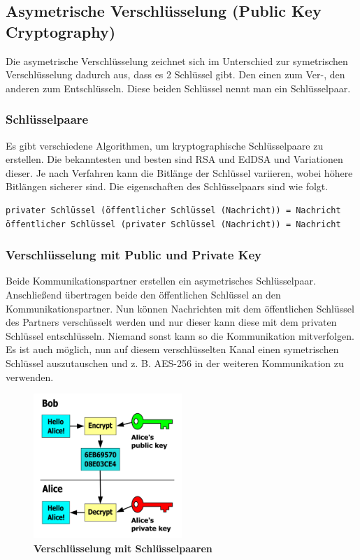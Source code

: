 \clearpage

\subsection{Asymetrische Verschlüsselung (Public Key Cryptography)}

Die asymetrische Verschlüsselung zeichnet sich im Unterschied zur symetrischen
Verschlüsselung dadurch aus, dass es 2 Schlüssel gibt. Den einen zum Ver-, den anderen
zum Entschlüsseln. Diese beiden Schlüssel nennt man ein Schlüsselpaar.

\subsubsection{Schlüsselpaare}
Es gibt verschiedene Algorithmen, um kryptographische Schlüsselpaare zu erstellen.
Die bekanntesten und besten sind RSA und EdDSA und Variationen dieser.
Je nach Verfahren kann die Bitlänge der Schlüssel variieren, wobei höhere Bitlängen
sicherer sind. Die eigenschaften des Schlüsselpaars sind wie folgt.

\begin{lstlisting}
privater Schlüssel (öffentlicher Schlüssel (Nachricht)) = Nachricht
öffentlicher Schlüssel (privater Schlüssel (Nachricht)) = Nachricht 
\end{lstlisting}

\subsubsection{Verschlüsselung mit Public und Private Key}

Beide Kommunikationspartner erstellen ein asymetrisches Schlüsselpaar.
Anschließend übertragen beide den öffentlichen Schlüssel an den Kommunikationspartner.
Nun können Nachrichten mit dem öffentlichen Schlüssel des Partners verschüsselt werden
und nur dieser kann diese mit dem privaten Schlüssel entschlüsseln. Niemand sonst kann
so die Kommunikation mitverfolgen. Es ist auch möglich, nun auf diesem verschlüsselten
Kanal einen symetrischen Schlüssel auszutauschen und z. B. AES-256 in der weiteren
Kommunikation zu verwenden.

\begin{figure}[H]
    \centering
    \includegraphics[width=0.5\textwidth]{images/public-key-encryption.png}
    \caption{\textbf{Verschlüsselung mit Schlüsselpaaren}}
\end{figure}

